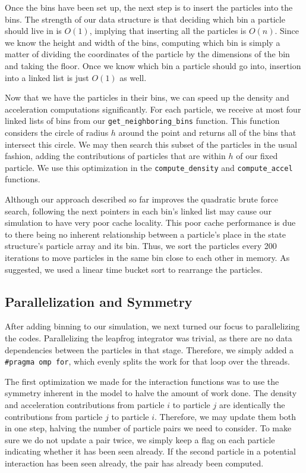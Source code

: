 \documentclass[12pt]{article}
\def\ind{\vspace{0.75em}\noindent}
\begin{document}
\ind Once the bins have been set up, the next step is to insert the particles
into the bins. The strength of our data structure is that deciding which
bin a particle should live in is $O(1)$, implying that inserting all
the particles is $O(n)$. Since we know the height and width of the
bins, computing which bin is simply a matter of dividing the coordinates
of the particle by the dimensions of the bin and taking the floor.
Once we know which bin a particle should go into, insertion into a
linked list is just $O(1)$ as well.

\ind Now that we have the particles in their bins, we can speed up the
density and acceleration computations significantly. For each particle,
we receive at most four linked lists of bins from our {\tt get\_neighboring\_bins}
function. This function considers the circle of radius $h$ around the
point and returns all of the bins that intersect this circle. We
may then search this subset of the particles in the usual fashion,
adding the contributions of particles that are within $h$ of our
fixed particle. We use this optimization in the {\tt compute\_density}
and {\tt compute\_accel} functions.

\ind Although our approach described so far improves the quadratic
brute force search, following the next pointers in each bin's
linked list may cause our simulation to have very poor cache
locality. This poor cache performance is due to there being no
inherent relationship between a particle's place in the state structure's
particle array and its bin. Thus, we sort the particles every
200 iterations to move particles in the same bin close to each
other in memory. As suggested, we used a linear time bucket
sort to rearrange the particles.

\subsection*{Parallelization and Symmetry}
After adding binning to our simulation, we next turned our focus to
parallelizing the codes. Parallelizing the leapfrog integrator was
trivial, as there are no data dependencies between the particles
in that stage. Therefore, we simply added a {\tt \#pragma omp for},
which evenly splits the work for that loop over the threads.

\ind The first optimization we made for the interaction functions
was to use the symmetry inherent in the model to halve the amount
of work done. The density and acceleration contributions from particle
$i$ to particle $j$ are identically the contributions from particle
$j$ to particle $i$. Therefore, we may update them both in
one step, halving the number of particle pairs we need to consider.
To make sure we do not update a pair twice, we simply keep a flag
on each particle indicating whether it has been seen already. If
the second particle in a potential interaction has been seen
already, the pair has already been computed.
\end{document}
